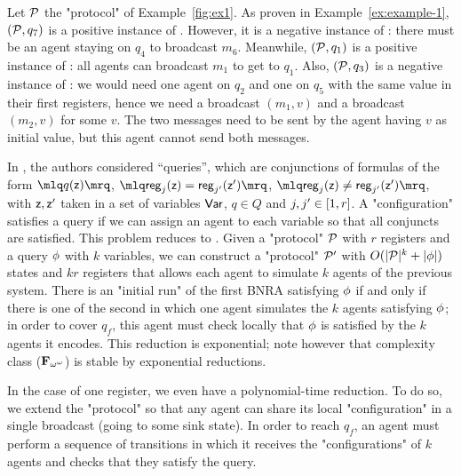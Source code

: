 \begin{example}\label{example-2}
	Let $\mathcal{P}$ the "protocol" of Example~\ref{fig:ex1}. As proven in Example~\ref{ex:example-1}, $(\mathcal{P},q_7)$ is a positive instance of \COVER. However, it is a negative instance of \TARGET: there must be an agent staying on $q_4$ to broadcast $m_6$. Meanwhile, $(\mathcal{P},q_1)$ is a positive instance of \TARGET: all agents can broadcast $m_1$ to get to $q_1$. Also, $(\mathcal{P}, q_3)$ is a negative instance of \COVER: we would need one agent on $q_2$ and one on $q_5$ with the same value in their first registers, hence we need a broadcast $(m_1,v)$ and a broadcast $(m_2,v)$ for some $v$. The two messages need to be sent by the agent having $v$ as initial value, but this agent cannot send both messages.
\end{example}

\begin{remark}
	In \cite{DelzannoST13}, the authors considered ``queries'', which are conjunctions of formulas of the form $\quotemarks{q(\var{z})}$, $\quotemarks{\mathsf{reg}_j(\var{z}) = \mathsf{reg}_{j'}(\var{z}')}$, $\quotemarks{\mathsf{reg}_j(\var{z}) \neq \mathsf{reg}_{j'}(\var{z}')}$, with $\mathsf{z}, \mathsf{z}'$ taken in a set of variables $\mathsf{Var}$, $q\in Q$ and $j,j' \in [1,r]$. A "configuration" satisfies a query if we can assign an agent to each variable so that all conjuncts are satisfied.
	This problem reduces to \COVER.
	Given a "protocol" $\mathcal{P}$ with $r$ registers and a query $\phi$ with $k$ variables, we can construct a "protocol" $\mathcal{P}'$ with $O(|\mathcal{P}|^k + |\phi|)$ states and $kr$ registers that allows each agent to simulate $k$ agents of the previous system.
	There is an "initial run" of the first BNRA satisfying $\phi$ if and only if there is one of the second in which one agent simulates the $k$ agents satisfying $\phi$; in order to cover $q_f$, this agent must check locally that $\phi$ is satisfied by the $k$ agents it encodes.
	This reduction is exponential; note however that complexity class ($\mathbf{F}_{\omega^{\omega}}$) is stable by exponential reductions.
	
	In the case of one register, we even have a polynomial-time reduction. To do so, we extend the "protocol" so that any agent can share its local "configuration" in a single broadcast (going to some sink state).
	In order to reach $q_f$, an agent must perform a sequence of transitions in which it receives the "configurations" of $k$ agents and checks that they satisfy the query.
\end{remark}


